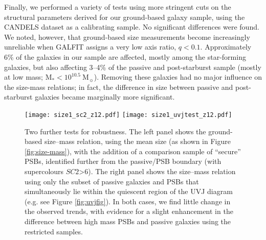 \documentclass[a4paper,fleqn,usenatbib,useAMS]{mnras}
\begin{document}
Finally, we performed a variety of tests using more stringent cuts on
the structural parameters derived for our ground-based galaxy sample,
using the CANDELS dataset as a calibrating sample. No significant
differences were found. We noted, however,  that ground-based size
measurements become increasingly unreliable when GALFIT assigns a very
low axis ratio, $q<0.1$. Approximately 6\% of the galaxies in our
sample are affected, mostly among the star-forming galaxies, but also
affecting 3--4\% of the passive and post-starburst sample (mostly at
low mass; M$_{\ast}< 10^{10.5} ~$M$_{\sun}$). Removing these galaxies
had no major influence on the size-mass relations; in fact, the
difference in size between passive and post-starburst galaxies became
marginally more significant.




\begin{figure*}
	\texttt{[image: size1\_sc2\_z12.pdf]}
	\texttt{[image: size1\_uvjtest\_z12.pdf]}
    \caption{Two further tests for robustness. The left panel shows
      the ground-based size--mass relation, using the mean size (as
      shown in Figure \ref{fig:size-mass}), with the addition of a
      comparison sample of ``secure'' PSBs, identified further from
      the passive/PSB boundary (with supercolours $SC2$>6).  The right
      panel shows the size--mass relation using only the subset of
      passive galaxies and PSBs that simultaneously lie within the
      quiescent region of the UVJ diagram (e.g. see Figure
      \ref{fig:uvjfig}). In both cases, we find little change in the
      observed trends, with evidence for a slight enhancement
in the difference between high mass PSBs and passive
      galaxies using the restricted samples.}
    \label{fig:appenfig2}
\end{figure*}





\bsp	%
\label{lastpage}
\end{document}
